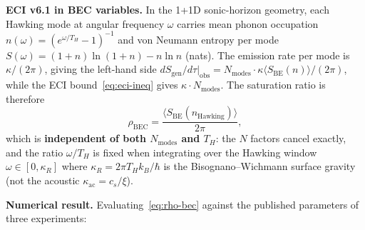 \documentclass[reprint,amsmath,amssymb,aps,prd,superscriptaddress]{revtex4-2}
\providecommand{\1}{\mathbf{1}}
\begin{document}
\medskip\noindent\textbf{ECI v6.1 in BEC variables.}
In the 1+1D sonic-horizon geometry, each Hawking mode at angular frequency $\omega$ carries
mean phonon occupation $n(\omega) = (e^{\omega/T_H}-1)^{-1}$ and von Neumann entropy
per mode $S(\omega) = (1+n)\ln(1+n) - n\ln n$ (nats).
The emission rate per mode is $\kappa/(2\pi)$, giving the left-hand side
$dS_\mathrm{gen}/d\tau|_\mathrm{obs} = N_\mathrm{modes}\cdot\kappa\langle S_\mathrm{BE}(n)\rangle/(2\pi)$,
while the ECI bound~\eqref{eq:eci-ineq} gives $\kappa\cdot N_\mathrm{modes}$.
The saturation ratio is therefore
\begin{equation}
  \rho_\mathrm{BEC} = \frac{\langle S_\mathrm{BE}(n_\mathrm{Hawking})\rangle}{2\pi},
  \label{eq:rho-bec}
\end{equation}
which is \textbf{independent of both $N_\mathrm{modes}$ and $T_H$}:
the $N$ factors cancel exactly, and the ratio $\omega/T_H$ is fixed when integrating
over the Hawking window $\omega \in [0,\kappa_R]$ where $\kappa_R = 2\pi T_H k_B/\hbar$
is the Bisognano--Wichmann surface gravity (not the acoustic $\kappa_{\mathrm{ac}} = c_s/\xi$).

\medskip\noindent\textbf{Numerical result.}
Evaluating~\eqref{eq:rho-bec} against the published parameters of three experiments:
\end{document}
